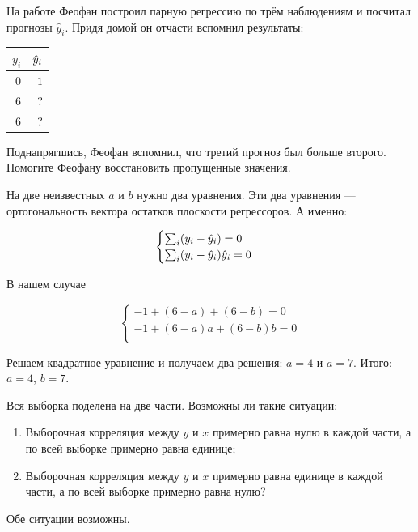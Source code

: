 \begin{problem}
На работе Феофан построил парную регрессию по трём наблюдениям и посчитал прогнозы $\hat{y}_i$. Придя домой он отчасти вспомнил результаты:

\begin{tabular}{rr}
\toprule
$y_i$ & $\hat{y}_i$ \\
\midrule
$0$ & $1$ \\
$6$ & ? \\
$6$ & ? \\
\bottomrule
\end{tabular}

Поднапрягшись, Феофан вспомнил, что третий прогноз был больше второго.
Помогите Феофану восстановить пропущенные значения.


\begin{sol}
На две неизвестных $a$ и $b$ нужно два уравнения. Эти два уравнения — ортогональность вектора остатков плоскости регрессоров. А именно:

\[
\begin{cases}
\sum_i (y_i - \hat{y}_i) = 0 \\
\sum_i (y_i - \hat{y}_i) \hat{y}_i = 0 \\
\end{cases}
\]

В нашем случае

\[
\begin{cases}
-1 +(6-a) + (6-b) = 0 \\
-1 + (6 - a)a + (6-b)b = 0 \\
\end{cases}
\]

Решаем квадратное уравнение и получаем два решения: $a=4$ и $a=7$. Итого: $a=4$, $b=7$.
\end{sol}
\end{problem}


\begin{problem}
Вся выборка поделена на две части. Возможны ли такие ситуации:
\begin{enumerate}
    \item Выборочная корреляция между $y$ и $x$ примерно равна нулю в каждой части,
    а по всей выборке примерно равна единице;
    \item Выборочная корреляция между $y$ и $x$ примерно равна единице в каждой части,
    а по всей выборке примерно равна нулю?
\end{enumerate}

\begin{sol}
Обе ситуации возможны.
\end{sol}
\end{problem}


